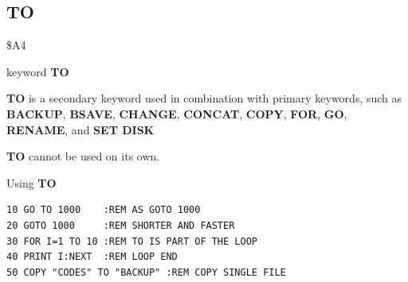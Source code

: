 
\newpage
\subsection{TO}
\begin{description}[leftmargin=2cm,style=nextline]
\item [Token:] \$A4
\item [Format:] keyword {\bf TO}
\item [Usage:]  {\bf TO} is a secondary keyword used in
                combination with primary key\-words, such as
                {\bf BACKUP}, {\bf BSAVE}, {\bf CHANGE}, {\bf CONCAT},
                {\bf COPY}, {\bf FOR}, {\bf GO}, {\bf RENAME}, and {\bf SET DISK}

\item [Remarks:] {\bf TO} cannot be used on its own.

\item [Example:] Using {\bf TO}

\begin{tcolorbox}[colback=black,coltext=white]
\verbatimfont{\codefont}
\begin{verbatim}
10 GO TO 1000    :REM AS GOTO 1000
20 GOTO 1000     :REM SHORTER AND FASTER
30 FOR I=1 TO 10 :REM TO IS PART OF THE LOOP
40 PRINT I:NEXT  :REM LOOP END
50 COPY "CODES" TO "BACKUP" :REM COPY SINGLE FILE
\end{verbatim}
\end{tcolorbox}
\end{description}


\newpage
